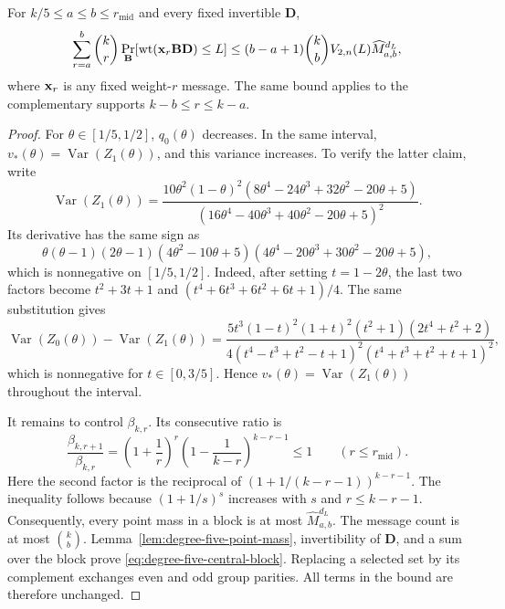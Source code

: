 \begin{lemma}
\label{lem:degree-five-central-block}
For $k/5\leq a\leq b\leq r_{\mathrm{mid}}$ and every fixed invertible
$\mathbf D$,
\begin{equation}
 \sum_{r=a}^{b}\binom{k}{r}
 \Pr_{\mathbf B}[\operatorname{wt}(\mathbf x_r\mathbf B\mathbf D)\leq L]
 \leq
 (b-a+1)\binom{k}{b}V_{2,n}(L)\widehat M_{a,b}^{d_L},
 \label{eq:degree-five-central-block}
\end{equation}
where $\mathbf x_r$ is any fixed weight-$r$ message.  The same bound applies to
the complementary supports $k-b\leq r\leq k-a$.
\end{lemma}

\begin{proof}
For $\theta\in[1/5,1/2]$, $q_0(\theta)$ decreases.  In the same interval,
$v_*(\theta)=\operatorname{Var}(Z_1(\theta))$, and this variance increases.
To verify the latter claim, write
\begin{equation*}
 \operatorname{Var}(Z_1(\theta))=
 \frac{10\theta^2(1-\theta)^2
 (8\theta^4-24\theta^3+32\theta^2-20\theta+5)}
 {(16\theta^4-40\theta^3+40\theta^2-20\theta+5)^2}.
\end{equation*}
Its derivative has the same sign as
\begin{equation*}
 \theta(\theta-1)(2\theta-1)(4\theta^2-10\theta+5)
 (4\theta^4-20\theta^3+30\theta^2-20\theta+5),
\end{equation*}
 which is nonnegative on $[1/5,1/2]$.  Indeed, after setting $t=1-2\theta$,
 the last two factors become
 $t^2+3t+1$ and
 $(t^4+6t^3+6t^2+6t+1)/4$.
 The same substitution gives
 \begin{equation*}
  \operatorname{Var}(Z_0(\theta))-\operatorname{Var}(Z_1(\theta))=
  \frac{5t^3(1-t)^2(1+t)^2(t^2+1)(2t^4+t^2+2)}
  {4(t^4-t^3+t^2-t+1)^2(t^4+t^3+t^2+t+1)^2},
 \end{equation*}
 which is nonnegative for $t\in[0,3/5]$.  Hence
 $v_*(\theta)=\operatorname{Var}(Z_1(\theta))$ throughout the interval.

It remains to control $\beta_{k,r}$.  Its consecutive ratio is
\begin{equation*}
 \frac{\beta_{k,r+1}}{\beta_{k,r}}
 =\left(1+\frac1r\right)^r
  \left(1-\frac1{k-r}\right)^{k-r-1}\leq1
 \qquad(r\leq r_{\mathrm{mid}}).
\end{equation*}
 Here the second factor is the reciprocal of
 $(1+1/(k-r-1))^{k-r-1}$.  The inequality follows because
 $(1+1/s)^s$ increases with $s$ and $r\leq k-r-1$.
Consequently, every point mass in a block is at most
$\widehat M_{a,b}^{d_L}$.  The message count is at most $\binom{k}{b}$.
Lemma~\ref{lem:degree-five-point-mass}, invertibility of $\mathbf D$, and a
sum over the block prove \eqref{eq:degree-five-central-block}.  Replacing a
selected set by its complement exchanges even and odd group parities.  All
terms in the bound are therefore unchanged.
\end{proof}

